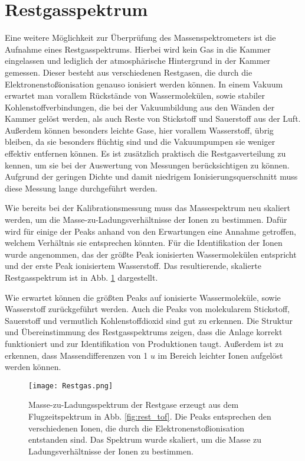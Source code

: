 \section{Restgasspektrum}
Eine weitere Möglichkeit zur Überprüfung des Massenspektrometers ist die Aufnahme eines Restgasspektrums. Hierbei wird kein Gas in die Kammer eingelassen und lediglich der atmosphärische Hintergrund in der Kammer gemessen. Dieser besteht aus verschiedenen Restgasen, die durch die Elektronenstoßionisation genauso ionisiert werden können. In einem Vakuum erwartet man vorallem Rückstände von Wassermolekülen, sowie stabiler Kohlenstoffverbindungen, die bei der Vakuumbildung aus den Wänden der Kammer gelöst werden, als auch Reste von Stickstoff und Sauerstoff aus der Luft. Außerdem können besonders leichte Gase, hier vorallem Wasserstoff, übrig bleiben, da sie besonders flüchtig sind und die Vakuumpumpen sie weniger effektiv entfernen können. Es ist zusätzlich praktisch die Restgasverteilung zu kennen, um sie bei der Auswertung von Messungen berücksichtigen zu können. Aufgrund der geringen Dichte und damit niedrigem Ionisierungsquerschnitt muss diese Messung lange durchgeführt werden. 

Wie bereits bei der Kalibrationsmessung muss das Massespektrum neu skaliert werden, um die Masse-zu-Ladungsverhältnisse der Ionen zu bestimmen. Dafür wird für einige der Peaks anhand von den Erwartungen eine Annahme getroffen, welchem Verhältnis sie entsprechen könnten. Für die Identifikation der Ionen wurde angenommen, das der größte Peak ionisierten Wassermolekülen
entspricht und der erste Peak ionisiertem Wasserstoff. Das resultierende, skalierte Restgasspektrum ist in Abb. \ref{fig:rest} dargestellt.

Wie erwartet können die größten Peaks auf ionisierte Wassermoleküle, sowie Wasserstoff zurückgeführt werden. Auch die Peaks von molekularem Stickstoff, Sauerstoff und vermutlich Kohlenstoffdioxid sind gut zu erkennen. Die Struktur und Übereinstimmung des Restgasspektrums zeigen, dass die Anlage korrekt funktioniert und zur Identifikation von Produktionen taugt. Außerdem ist zu erkennen, dass Massendifferenzen von 1 $u$ im Bereich leichter Ionen aufgelöst werden können. 

\begin{figure}
    \centering
    \hspace*{-1cm}
    \texttt{[image: Restgas.png]}
    \caption[Masse-zu-Ladungsspektrum der Restgase]{Masse-zu-Ladungsspektrum der Restgase erzeugt aus dem Flugzeitspektrum in Abb. \ref{fig:rest_tof}. Die Peaks entsprechen den verschiedenen Ionen, die durch die Elektronenstoßionisation entstanden sind. Das Spektrum wurde skaliert, um die Masse zu Ladungsverhältnisse der Ionen zu bestimmen.}
    \label{fig:rest}
\end{figure}

